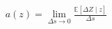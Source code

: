 \documentclass[preview]{standalone}
\begin{document}
\begin{align*}
a(z)=\lim_{\Delta s\to0}\frac{\mathbb E[\Delta Z\mid z]}{\Delta s}
\end{align*}
\end{document}
